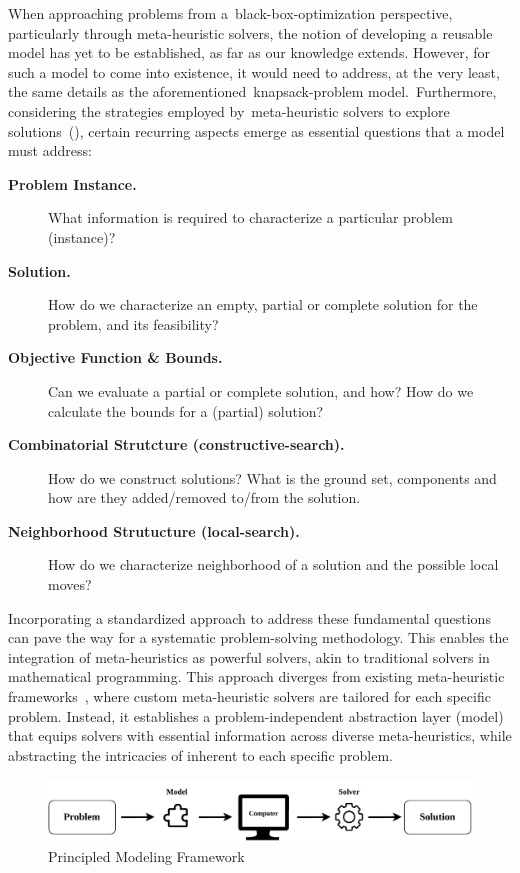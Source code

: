 When approaching problems from a~\acrshort{black-box-optimization} perspective,
particularly through \acrshort{meta-heuristic} solvers, the notion of developing
a reusable model has yet to be established, as far as our knowledge extends.
However, for such a model to come into existence, it would need to address, at
the very least, the same details as the
aforementioned~\acrshort{knapsack-problem} model.~Furthermore, considering the
strategies employed by~\acrshort{meta-heuristic} solvers to explore
solutions~(), certain recurring aspects emerge as
essential questions that a model must address:

\begin{description}
  \item[\textbf{Problem Instance.}] What information is required to characterize a particular problem (instance)?
  \item[\textbf{Solution.}] How do we characterize an empty, partial or complete solution for the problem, and its feasibility?
  \item[\textbf{Objective Function \& Bounds.}] Can we evaluate a partial or complete solution, and how? How do we calculate the bounds for a (partial) solution?
  \item[\textbf{Combinatorial Strutcture (\acrshort{constructive-search}).}] How do we construct solutions? What is the ground set, components and how are they added/removed to/from the solution.
  \item[\textbf{Neighborhood Strutucture (\acrshort{local-search}).}] How do we characterize neighborhood of a solution and the possible local moves?
\end{description}

Incorporating a standardized approach to address these fundamental questions can
pave the way for a systematic problem-solving methodology. This enables the
integration of meta-heuristics as powerful solvers, akin to traditional solvers
in mathematical programming. This approach diverges from existing meta-heuristic
frameworks~\cite{cahon2004paradiseoa,digaspero2003easylocal,durillo2011jmetal},
where custom meta-heuristic solvers are tailored for each specific problem.
Instead, it establishes a problem-independent abstraction layer (model) that
equips solvers with essential information across diverse meta-heuristics, while
abstracting the intricacies of inherent to each specific problem.

\begin{figure}[h]
  \centering
  \includegraphics[width=\textwidth,keepaspectratio]{../assets/modelling/modelling.pdf}
  \caption{Principled Modeling Framework}
  \label{fig:pmf}
\end{figure}

